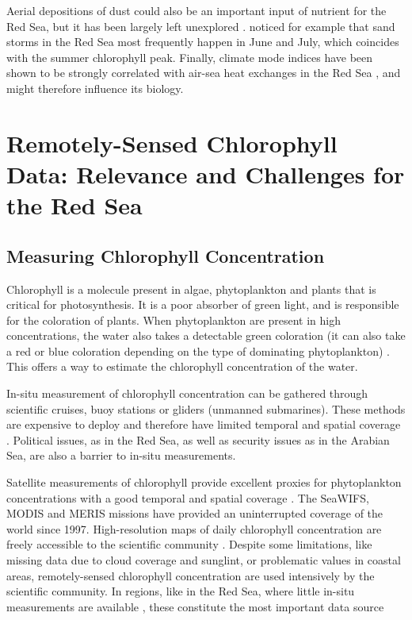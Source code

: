 Aerial depositions of dust could also be an important input of nutrient for the Red Sea, but it has been largely left unexplored \cite{Triantafyllou2014}. \cite{Raitsos2013} noticed for example that sand storms in the Red Sea most frequently happen in June and July, which coincides with the summer chlorophyll peak. Finally, climate mode indices have been shown to be strongly correlated with air-sea heat exchanges in the Red Sea \cite{Abulnaja2015}, and might therefore influence its biology.

\section{Remotely-Sensed Chlorophyll Data: Relevance and Challenges for the Red
Sea}

\subsection{Measuring Chlorophyll Concentration}

Chlorophyll is a molecule present in algae, phytoplankton and plants that is critical for photosynthesis. It is a poor absorber of green light, and is responsible for the coloration of plants. When phytoplankton are present in high concentrations, the water also takes a detectable green coloration (it can also take a red or blue coloration depending on the type of dominating phytoplankton) \cite{Robinson2010}. This offers a way to estimate the chlorophyll concentration of the water.

In-situ measurement of chlorophyll concentration can be gathered through scientific cruises, buoy stations or gliders (unmanned submarines). These methods are expensive to deploy and therefore have limited temporal and spatial coverage \cite{Robinson2010}. Political issues, as in the Red Sea, as well as security issues as in the Arabian Sea, are also a barrier to in-situ measurements.

Satellite measurements of chlorophyll provide excellent proxies for phytoplankton concentrations with a good temporal and spatial coverage \cite{Robinson2010}. The SeaWIFS, MODIS and MERIS missions have provided an uninterrupted coverage of the world since 1997. High-resolution maps of daily chlorophyll concentration are freely accessible to the scientific community \cite{McClain2009}. Despite some limitations, like missing data due to cloud coverage and sunglint, or problematic values in coastal areas, remotely-sensed chlorophyll concentration are used intensively by the scientific community. In regions, like in the Red Sea, where little in-situ measurements are available \cite{Raitsos2013, Brewin2013}, these constitute the most important data source 


